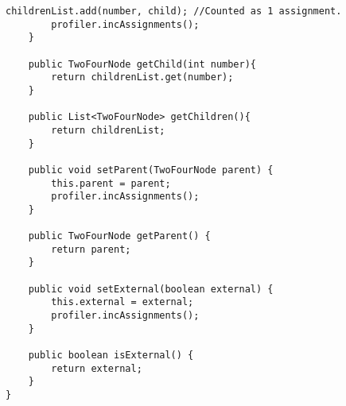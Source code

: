 \begin{lstlisting}[caption=TwoFourTree classes Source code - TwoFourNode]
		childrenList.add(number, child); //Counted as 1 assignment.
		profiler.incAssignments();
	}
	
	public TwoFourNode getChild(int number){
		return childrenList.get(number);
	}
	
	public List<TwoFourNode> getChildren(){
		return childrenList;
	}

	public void setParent(TwoFourNode parent) {
		this.parent = parent;
		profiler.incAssignments();
	}

	public TwoFourNode getParent() {
		return parent;
	}

	public void setExternal(boolean external) {
		this.external = external;
		profiler.incAssignments();
	}

	public boolean isExternal() {
		return external;
	}
}
\end{lstlisting}